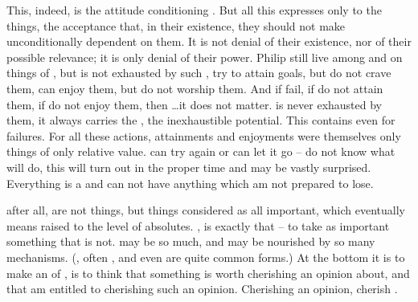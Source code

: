 This, indeed, is the  attitude conditioning .
But all this  expresses only  to the
 things, the acceptance that, in their  existence, they
should not make  unconditionally dependent on them.  It is not denial of
their existence, nor of their possible relevance; it is only denial of their
 power.  \citet{Fear not the flesh nor love it. If you fear it, it
  will gain mastery over you. If you love it, it will swallow and paralyze
  you.}{Philip}{}  still live among and  on things of , but  is not exhausted by such ,  try
to attain  goals, but  do not crave them,  can enjoy
them, but  
do not worship them.  And if  fail, if  do not attain them, if
 do not enjoy them, then \ldots it does not matter.   is never
exhausted by them, it always carries the , the inexhaustible potential.
This  contains  even for  failures.  For all
these actions, attainments and enjoyments were themselves only 
things of only relative value.   can try again or  can let it go --
 do not know what  will do, this will turn out in the proper time
and  may be vastly surprised. Everything is a  and  can not
have anything which  am not prepared to lose.

\pa {} after all, 
 are not  things, but  things considered as
all important, which eventually means raised to the level of absolutes.
,  is exactly that -- to take as
 important something that is not.   may be so
much, and may be nourished by so many mechanisms. (, often
, and even  are
quite common forms.) At the bottom it is to make an  of ,
is to think that something  is worth cherishing an opinion about,
and that  am entitled to cherishing such an opinion.  Cherishing an
opinion,  cherish .

